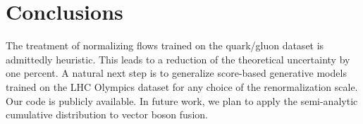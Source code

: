 \section{Conclusions}\label{sec:conclusions}

The treatment of normalizing flows trained on the quark/gluon dataset is
admittedly heuristic. This leads to a reduction of the theoretical
uncertainty by one percent. A natural next step is to generalize
score-based generative models trained on the LHC Olympics dataset for
any choice of the renormalization scale. Our code is publicly available.
In future work, we plan to apply the semi-analytic cumulative
distribution to vector boson fusion.

